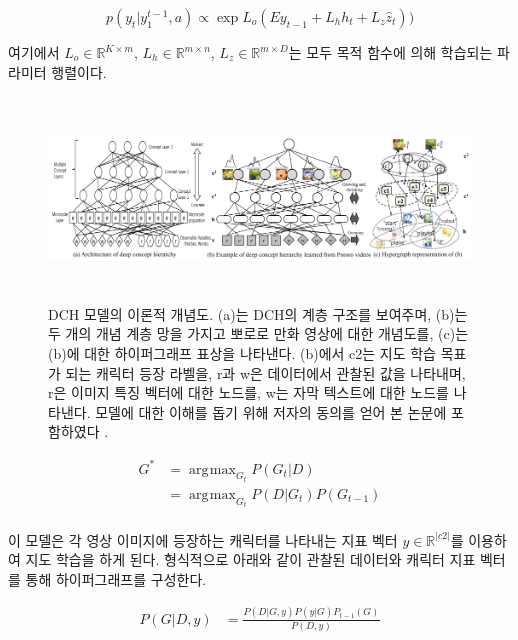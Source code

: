 \documentclass{kcc}
\DeclareMathOperator*{\argmax}{\arg\!\max}
\begin{document}
\begin{equation}
p(y_t|y^{t-1}_1,a) \propto \exp{L_o(Ey_{t-1} + L_{h}h_t + L_{z}\hat{z}_t))}
\end{equation}

여기에서 $L_{o} \in \mathbb{R}^{K \times m}$, $L_{h} \in \mathbb{R}^{m \times n}$, $L_{z} \in \mathbb{R}^{m \times D}$는 모두 목적 함수에 의해 학습되는 파라미터 행렬이다.

\begin{figure}
  \centerline{\includegraphics[width=180mm,height=54mm]{eps/ha2015_fig2.png}}
  \caption{DCH 모델의 이론적 개념도. (a)는 DCH의 계층 구조를 보여주며, (b)는 두 개의 개념 계층 망을 가지고 뽀로로 만화 영상에 대한 개념도를, (c)는 (b)에 대한 하이퍼그래프 표상을 나타낸다. (b)에서 c2는 지도 학습 목표가 되는 캐릭터 등장 라벨을, r과 w은 데이터에서 관찰된 값을 나타내며, r은 이미지 특징 벡터에 대한 노드를, w는 자막 텍스트에 대한 노드를 나타낸다. 모델에 대한 이해를 돕기 위해 저자의 동의를 얻어 본 논문에 포함하였다 \cite{Ha2015}.}
  \label{fig:ha2015}
\end{figure}



\begin{equation} 
\begin{split}
G^{*} & = \argmax_{G_{t}} P(G_{t}|D) \\
      & = \argmax_{G_{t}} P(D|G_{t})P(G_{t-1}) \\
\end{split}
\end{equation}

이 모델은 각 영상 이미지에 등장하는 캐릭터를 나타내는 지표 벡터 $y \in \mathds{R}^{|c2|}$를 이용하여 지도 학습을 하게 된다. 형식적으로 아래와 같이 관찰된 데이터와 캐릭터 지표 벡터를 통해 하이퍼그래프를 구성한다.

\begin{equation}
\begin{split}
P(G|D,y) & = \frac{P(D|G,y) P(y|G) P_{t-1}(G)} {P(D,y)} \\
\end{split}
\end{equation}
\end{document}
